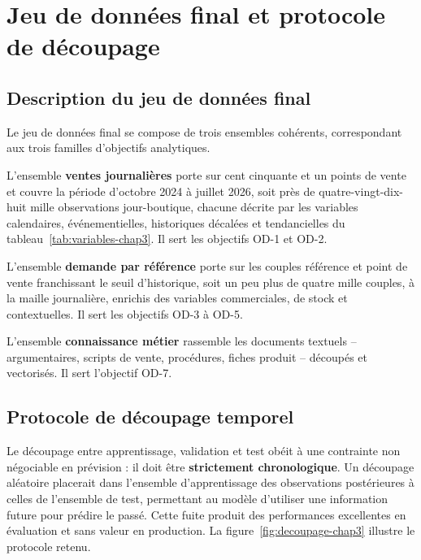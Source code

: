 \section{Jeu de données final et protocole de découpage}
\label{sec:jeu-final}

\subsection{Description du jeu de données final}

Le jeu de données final se compose de trois ensembles cohérents, correspondant aux trois familles d'objectifs analytiques.

L'ensemble \textbf{ventes journalières} porte sur cent cinquante et un points de vente et couvre la période d'octobre 2024 à juillet 2026, soit près de quatre-vingt-dix-huit mille observations jour-boutique, chacune décrite par les variables calendaires, événementielles, historiques décalées et tendancielles du tableau~\ref{tab:variables-chap3}. Il sert les objectifs OD-1 et OD-2.

L'ensemble \textbf{demande par référence} porte sur les couples référence et point de vente franchissant le seuil d'historique, soit un peu plus de quatre mille couples, à la maille journalière, enrichis des variables commerciales, de stock et contextuelles. Il sert les objectifs OD-3 à OD-5.

L'ensemble \textbf{connaissance métier} rassemble les documents textuels -- argumentaires, scripts de vente, procédures, fiches produit -- découpés et vectorisés. Il sert l'objectif OD-7.

\subsection{Protocole de découpage temporel}

Le découpage entre apprentissage, validation et test obéit à une contrainte non négociable en prévision : il doit être \textbf{strictement chronologique}. Un découpage aléatoire placerait dans l'ensemble d'apprentissage des observations postérieures à celles de l'ensemble de test, permettant au modèle d'utiliser une information future pour prédire le passé. Cette fuite produit des performances excellentes en évaluation et sans valeur en production. La figure~\ref{fig:decoupage-chap3} illustre le protocole retenu.

